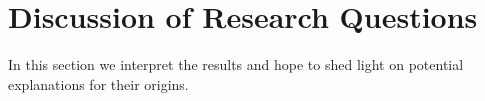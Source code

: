 






\section{Discussion of Research Questions}
In this section we interpret the results and hope to shed light on potential explanations for their origins. %




